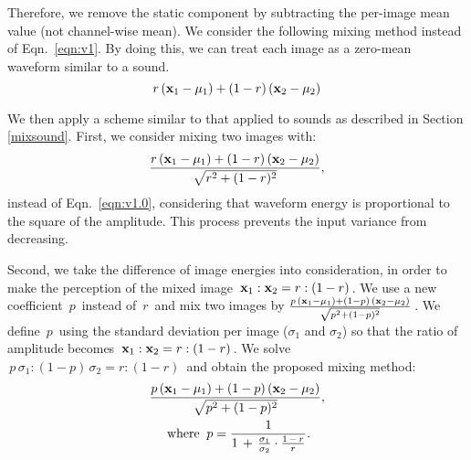 \documentclass[10pt,twocolumn,letterpaper]{article}
\begin{document}
Therefore, we remove the static component by subtracting the per-image mean value (not channel-wise mean). We consider the following mixing method instead of Eqn.~\ref{eqn:v1}. By doing this, we can treat each image as a zero-mean waveform similar to a sound.
\begin{equation}
 \label{eqn:v1.0}
  r \, ({\bf x}_1 - \mu_1) + (1-r) \, ({\bf x}_2 - \mu_2)
\end{equation}

We then apply a scheme similar to that applied to sounds as described in Section \ref{mixsound}. First, we consider mixing two images with:
\begin{equation}
 \label{eqn:v1.5}
  \frac{r \, ({\bf x}_1-\mu_1) + (1-r) \, ({\bf x}_2-\mu_2)}{\sqrt{r^2 + (1-r)^2}},
\end{equation}
instead of Eqn.~\ref{eqn:v1.0}, considering that waveform energy is proportional to the square of the amplitude. This process prevents the input variance from decreasing.

Second, we take the difference of image energies into consideration, in order to make the perception of the mixed image $\, {\bf x}_1:{\bf x}_2=r:(1-r) \,$. We use a new coefficient $\,p \,$ instead of $\, r \,$ and mix two images by $\frac{p \, ({\bf x}_1 - \mu_1) + (1-p) \, ({\bf x}_2 - \mu_2)}{\sqrt{p^2 + (1-p)^2}}\,$. We define $\, p \,$ using the standard deviation per image ($\sigma_1$ and $\sigma_2$) so that the ratio of amplitude becomes $\, {\bf x}_1:{\bf x}_2=r:(1-r) \,$. We solve $\, p \, \sigma_1 : (1 - p)  \, \sigma_2 = r:(1-r) \,$ and obtain the proposed mixing method:
\begin{equation}
\begin{split}
 \label{eqn:v2}
  \frac{p \, ({\bf x}_1-\mu_1) + (1-p) \, ({\bf x}_2-\mu_2)}{\sqrt{p^2 + (1-p)^2}}, \\ 
  {\rm where} \;\; p = \frac{1}{1\,+\, \frac{\sigma_1}{\sigma_2} \cdot \frac{1\,-\,r}{r}}. \hspace{4mm}
\end{split}
\end{equation}
\end{document}
